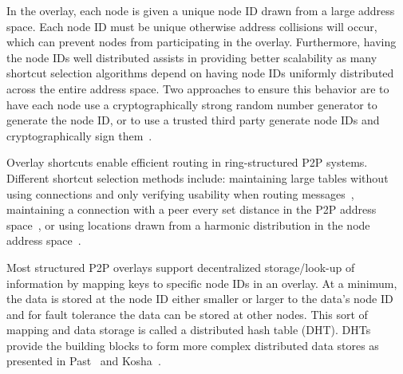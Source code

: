 \documentclass[letterpaper,twocolumn,10pt]{article}
\begin{document}
In the overlay, each node is given a unique node ID drawn from a large address
space.  Each node ID must be unique otherwise address collisions will occur,
which can prevent nodes from participating in the overlay.  Furthermore, having
the node IDs well distributed assists in providing better scalability as many
shortcut selection algorithms depend on having node IDs uniformly distributed
across the entire address space.  Two approaches to ensure this behavior are
to have each node use a cryptographically strong random number generator to
generate the node ID, or to use a trusted third party generate node IDs and
cryptographically sign them~\cite{secure_routing}.

%

Overlay shortcuts enable efficient routing in ring-structured P2P systems.
Different shortcut selection methods include: maintaining large tables without
using connections and only verifying usability when routing
messages~\cite{pastry, kademlia}, maintaining a connection with a peer every
set distance in the P2P address space~\cite{chord}, or using locations drawn
from a harmonic distribution in the node address space~\cite{symphony}.

Most structured P2P overlays support decentralized storage/look-up of information by
mapping keys to specific node IDs in an overlay.  At a minimum, the data is stored
at the node ID either smaller or larger to the data's node ID and for fault
tolerance the data can be stored at other nodes.  This sort of mapping
and data storage is called a distributed hash table (DHT).  DHTs provide the
building blocks to form more complex distributed data stores as presented in
Past~\cite{past} and Kosha~\cite{kosha}.
\end{document}
